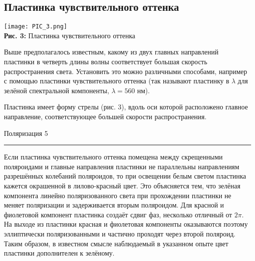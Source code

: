 \documentclass[12pt,a4paper]{scrartcl}
\begin{document}
	\subsection{Пластинка чувствительного оттенка}
	
	\begin{center}
		\texttt{[image: PIC\_3.png]}
		\\\textbf{Рис. 3:} Пластинка чувствительного оттенка
	\end{center}
	
	Выше предполагалось известным, какому из двух главных направлений пластинки в четверть длины волны соответствует большая скорость распространения света.
	Установить это можно различными способами, например с помощью
	пластинки чувствительного оттенка (так называют пластинку в $ \lambda $
	для зелёной спектральной компоненты, $ \lambda = 560 $ нм).
	
	Пластинка имеет форму стрелы (рис. 3), вдоль оси которой расположено главное направление, соответствующее большей скорости распространения.
	
	\newpage
	
	
	\begin{flushleft}
		\footnotesize{Поляризация} \hspace{\fill} \footnotesize{5}
		\\[-0.3cm]\noindent\rule{\textwidth}{0.3pt}
	\end{flushleft}
	
	Если пластинка чувствительного оттенка помещена между скрещенными поляроидами и главные направления пластинки не параллельны
	направлениям разрешённых колебаний поляроидов, то при освещении
	белым светом пластинка кажется окрашенной в лилово-красный цвет.
	Это объясняется тем, что зелёная компонента линейно поляризованного света при прохождении пластинки не меняет поляризации и задерживается вторым поляроидом. Для красной и фиолетовой компонент
	пластинка создаёт сдвиг фаз, несколько отличный от $ 2\pi $. На выходе
	из пластинки красная и фиолетовая компоненты оказываются поэтому
	эллиптически поляризованными и частично проходят через второй поляроид. Таким образом, в известном смысле наблюдаемый в указанном
	опыте цвет пластинки дополнителен к зелёному.
	
\end{document}

